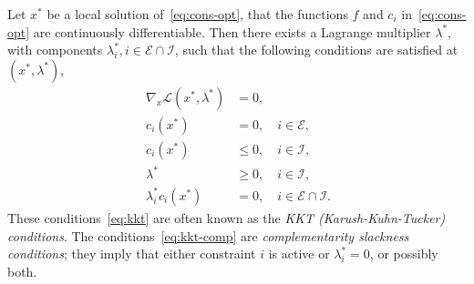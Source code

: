 \begin{definition}
    Let $x^*$ be a local solution of~\eqref{eq:cons-opt}, that the functions $f$ and $c_i$ in~\eqref{eq:cons-opt} are continuously differentiable. Then there exists a Lagrange multiplier $\lambda^*$, with components $\lambda_i^*, i \in \mathcal{E} \cap \mathcal{I}$, such that the following conditions are satisfied at $(x^*, \lambda^*)$,
    \begin{subequations}~\label{eq:kkt}
        \begin{alignat}{4}
            \nabla_x \mathcal{L}(x^*,\lambda^*) &= 0,  \\
            c_i(x^*) &= 0, \quad i \in \mathcal{E}, \\
            c_i(x^*) &\leq 0, \quad i \in \mathcal{I}, \\
            \lambda^* & \geq 0, \quad i \in \mathcal{I}, \\
            \lambda_i^* c_i(x^*) &= 0, \quad i \in \mathcal{E} \cap \mathcal{I}. \label{eq:kkt-comp}
        \end{alignat}
    \end{subequations}
These conditions~\eqref{eq:kkt} are often known as the \emph{KKT (Karush-Kuhn-Tucker) conditions}. The conditions~\eqref{eq:kkt-comp} are \emph{complementarity slackness conditions}; they imply that either constraint $i$ is active or $\lambda^*_i = 0$, or possibly both.
\end{definition}

